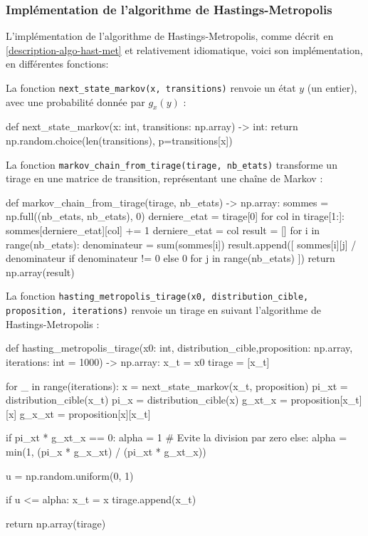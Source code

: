 \documentclass{article}
\begin{document}
\subsubsection{Implémentation de l'algorithme de Hastings-Metropolis}

L'implémentation de l'algorithme de Hastings-Metropolis, comme décrit en \ref{description-algo-hast-met} et relativement idiomatique, voici son implémentation, en différentes fonctions: 

La fonction \texttt{next\_state\_markov(x, transitions)} renvoie un état $y$ (un entier), avec une probabilité donnée par $g_x(y)$ :

\begin{python}
def next_state_markov(x: int, transitions: np.array) -> int:
    return np.random.choice(len(transitions), p=transitions[x])
\end{python}

La fonction \texttt{markov\_chain\_from\_tirage(tirage, nb\_etats)} transforme un tirage en une matrice de transition, représentant une chaîne de Markov :

\begin{python}
def markov_chain_from_tirage(tirage, nb_etats) -> np.array:
    sommes = np.full((nb_etats, nb_etats), 0)
    derniere_etat = tirage[0]
    for col in tirage[1:]:
        sommes[derniere_etat][col] += 1
        derniere_etat = col
    result = []
    for i in range(nb_etats):
        denominateur = sum(sommes[i])
        result.append([
            sommes[i][j] / denominateur if denominateur != 0 else 0 
            for j in range(nb_etats)
        ])
    return np.array(result)
\end{python}

\newpage %
La fonction \texttt{hasting\_metropolis\_tirage(x0, distribution\_cible, proposition, iterations)} 
renvoie un tirage en suivant l’algorithme de Hastings-Metropolis :

\begin{python}
def hasting_metropolis_tirage(x0: int, distribution_cible,proposition: np.array, iterations: int = 1000) -> np.array:
    x_t = x0
    tirage = [x_t]

    for _ in range(iterations):
        x = next_state_markov(x_t, proposition)
        pi_xt = distribution_cible(x_t)
        pi_x = distribution_cible(x)
        g_xt_x = proposition[x_t][x]
        g_x_xt = proposition[x][x_t]

        if pi_xt * g_xt_x == 0:
            alpha = 1 # Evite la division par zero
        else:
            alpha = min(1, (pi_x * g_x_xt) / (pi_xt * g_xt_x))

        u = np.random.uniform(0, 1)

        if u <= alpha:
            x_t = x
        tirage.append(x_t)

    return np.array(tirage)
\end{python}
\end{document}
